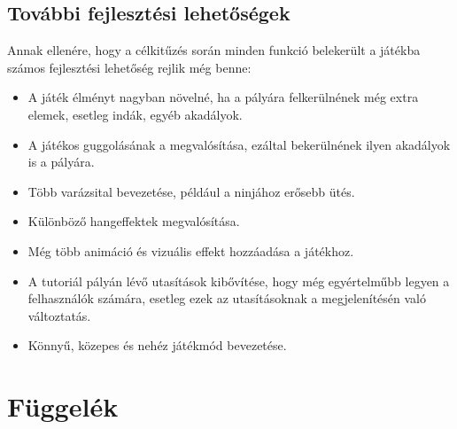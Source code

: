 \documentclass[12pt, a4paper]{report}
\theoremstyle{definition}
\begin{document}
	\section{További fejlesztési lehetőségek}
	Annak ellenére, hogy a célkitűzés során minden funkció belekerült a játékba számos fejlesztési lehetőség rejlik még benne:
	\begin{itemize} 
		\item A játék élményt nagyban növelné, ha a pályára felkerülnének még extra elemek, esetleg indák, egyéb akadályok.
		\item A játékos guggolásának a megvalósítása, ezáltal bekerülnének ilyen akadályok is a pályára.
		\item Több varázsital bevezetése, például a ninjához erősebb ütés.
		\item Különböző hangeffektek megvalósítása.
		\item Még több animáció és vizuális effekt hozzáadása a játékhoz.
		\item A tutoriál pályán lévő utasítások kibővítése, hogy még egyértelműbb legyen a felhasználók számára, esetleg ezek az utasításoknak a megjelenítésén való változtatás.
		\item Könnyű, közepes és nehéz játékmód bevezetése.
	\end{itemize}
	\chapter{Függelék}
	
\end{document}
